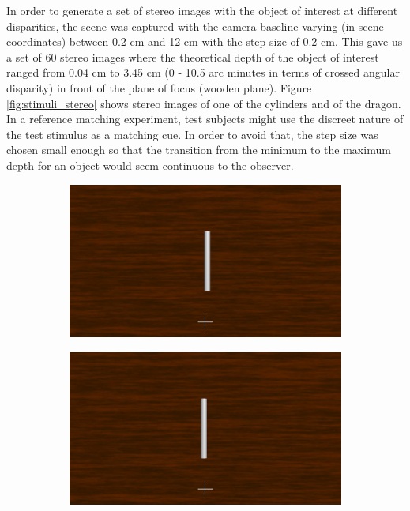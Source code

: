 In order to generate a set of stereo images with the object of interest at different disparities, the scene was captured with the camera baseline varying (in scene coordinates) between 0.2 cm and 12 cm with the step size of 0.2 cm. This gave us a set of 60 stereo images where the theoretical depth of the object of interest ranged from 0.04 cm to 3.45 cm (0 - 10.5 arc minutes in terms of crossed angular disparity) in front of the plane of focus (wooden plane). Figure \ref{fig:stimuli_stereo} shows stereo images of one of the cylinders and of the dragon. In a reference matching experiment, test subjects might use the discreet nature of the test stimulus as a matching cue. In order to avoid that, the step size was chosen small enough so that the transition from the minimum to the maximum depth for an object would seem continuous to the observer.
\begin{figure}[htbp]
    \begin{subfigure}[b]{0.5\textwidth}
        \includegraphics[width=\textwidth]{./Template_Figures/57L.png}
        \caption{}\label{fig:left_stereo_cyl}
    \end{subfigure}
    \begin{subfigure}[b]{0.5\textwidth}
        \includegraphics[width=\textwidth]{./Template_Figures/57R}
        \caption{}\label{fig:right_stereo_cyl}
    \end{subfigure}


\end{figure}

